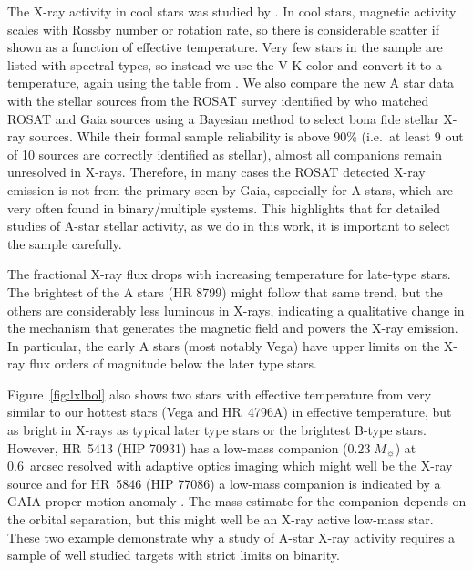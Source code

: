 \documentclass[linenumbers]{aastex631}
\begin{document}
The X-ray activity in cool stars was studied by \citet{2011ApJ...743...48W}. In cool stars, magnetic activity scales with Rossby number or rotation rate, so there is considerable scatter if shown as a function of effective temperature. Very few stars in the sample are listed with spectral types, so instead we use the V-K color and convert it to a temperature, again using the table from \citet{2013ApJS..208....9P}. 
We also compare the new A star data with the stellar sources from the ROSAT survey identified by \citet{Freund} who matched ROSAT and Gaia sources using a Bayesian method to select bona fide stellar X-ray sources. While their formal sample reliability is above 90\% (i.e.\ at least 9 out of 10 sources are correctly identified as stellar), almost all companions remain unresolved in X-rays. Therefore, in many cases the ROSAT detected X-ray emission is not from the primary seen by Gaia, especially for A stars, which are very often found in binary/multiple systems. This highlights that for detailed studies of A-star stellar activity, as we do in this work, it is important to select the sample carefully.

The fractional X-ray flux drops with increasing temperature for late-type stars. The brightest of the A stars (HR 8799) might follow that same trend, but the others are considerably less luminous in X-rays, indicating a qualitative change in the mechanism that generates the magnetic field and powers the X-ray emission. In particular, the early A stars (most notably Vega) have upper limits on the X-ray flux orders of magnitude below the later type stars. 

Figure~\ref{fig:lxlbol} also shows two stars with effective temperature from \citet{1996A&AS..118..481B} very similar to our hottest stars (Vega and HR~4796A) in effective temperature, but as bright in X-rays as typical later type stars or the brightest B-type stars. However, HR~5413 (HIP 70931) has a low-mass companion ($0.23\;M_\sun$) at 0.6~arcsec resolved with adaptive optics imaging \citep{2014MNRAS.437.1216D} which might well be the X-ray source and for HR~5846 (HIP 77086) a low-mass companion is indicated by a GAIA proper-motion anomaly \citep{2019A&A...623A..72K}. The mass estimate for the companion depends on the orbital separation, but this might well be an X-ray active low-mass star. These two example demonstrate why a study of A-star X-ray activity requires a sample of well studied targets with strict limits on binarity.
\end{document}
